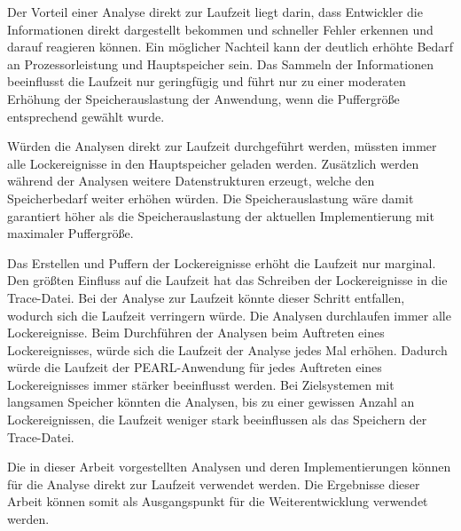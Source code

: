 Der Vorteil einer Analyse direkt zur Laufzeit liegt darin, dass Entwickler die
Informationen direkt dargestellt bekommen und schneller Fehler erkennen und
darauf reagieren können. Ein möglicher Nachteil kann der deutlich erhöhte Bedarf
an Prozessorleistung und Hauptspeicher sein. Das Sammeln der Informationen
beeinflusst die Laufzeit nur geringfügig und führt nur zu einer moderaten
Erhöhung der Speicherauslastung der Anwendung, wenn die Puffergröße entsprechend
gewählt wurde. 

Würden die Analysen direkt zur Laufzeit durchgeführt werden, müssten immer alle
Lockereignisse in den Hauptspeicher geladen werden. Zusätzlich werden während
der Analysen weitere Datenstrukturen erzeugt, welche den Speicherbedarf weiter
erhöhen würden. Die Speicherauslastung wäre damit garantiert höher als die
Speicherauslastung der aktuellen Implementierung mit maximaler Puffergröße.

Das Erstellen und Puffern der Lockereignisse erhöht die Laufzeit nur marginal.
Den größten Einfluss auf die Laufzeit hat das Schreiben der Lockereignisse in
die Trace-Datei. Bei der Analyse zur Laufzeit könnte dieser Schritt entfallen,
wodurch sich die Laufzeit verringern würde. Die Analysen durchlaufen immer alle
Lockereignisse. Beim Durchführen der Analysen beim Auftreten eines
Lockereignisses, würde sich die Laufzeit der Analyse jedes Mal erhöhen. Dadurch
würde die Laufzeit der PEARL-Anwendung für jedes Auftreten eines Lockereignisses
immer stärker beeinflusst werden. Bei Zielsystemen mit langsamen Speicher
könnten die Analysen, bis zu einer gewissen Anzahl an Lockereignissen, die
Laufzeit weniger stark beeinflussen als das Speichern der Trace-Datei.

Die in dieser Arbeit vorgestellten Analysen und deren Implementierungen können
für die Analyse direkt zur Laufzeit verwendet werden. Die Ergebnisse dieser
Arbeit können somit als Ausgangspunkt für die Weiterentwicklung verwendet
werden.